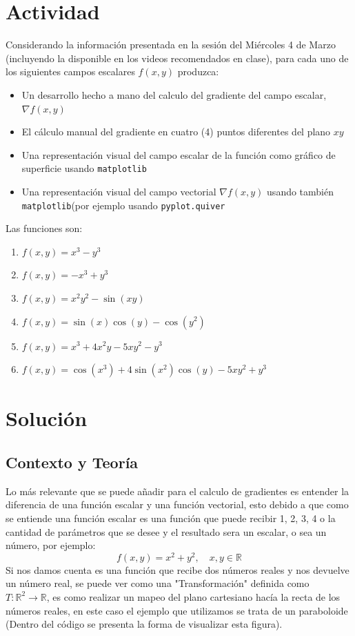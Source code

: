 \section*{Actividad}
Considerando la información presentada en la sesión del Miércoles 4 de Marzo (incluyendo la disponible en los videos recomendados en clase), para cada uno de los siguientes campos escalares $ f(x,y) $ produzca:
\begin{itemize}
    \item Un desarrollo hecho a mano del calculo del gradiente del campo escalar, $ \nabla  f(x,y) $ 
    \item El cálculo manual del gradiente en cuatro (4) puntos diferentes del plano $xy$
    \item Una representación visual del campo escalar de la función como gráfico de superficie usando \texttt{matplotlib}
    \item Una representación visual del campo vectorial $ \nabla  f(x,y) $ usando también \texttt{matplotlib}(por ejemplo usando \texttt{pyplot.quiver}
\end{itemize}
Las funciones son:
\begin{enumerate}
    \item $ f(x,y) = x^3-y^3 $
    \item $ f(x,y) = -x^3+y^3 $
    \item $ f(x,y) = x^2 y^2 -\sin{(xy)}$
    \item $ f(x,y) = \sin{(x)}\cos{(y)} -\cos{(y^2)}$
    \item $ f(x,y) = x^3+4x^2y - 5xy^2-y^3  $
    \item $ f(x,y) = \cos{(x^3)} + 4\sin{(x^2)}\cos{(y)}-5xy^2+y^3 $
\end{enumerate}
\section*{Solución}
\subsection*{Contexto y Teoría}
Lo más relevante que se puede añadir para el calculo de gradientes es entender la diferencia de una función escalar y una función vectorial, esto debido a que como se entiende una función escalar es una función que puede recibir 1, 2, 3, 4 o la cantidad de parámetros que se desee y el resultado sera un escalar, o sea un número, por ejemplo:
\[ f(x,y) = x^2 + y^2,\quad x,y \in \mathbb{R}\]
Si nos damos cuenta es una función que recibe dos números reales y nos devuelve un número real, se puede ver como una "Transformación"  definida como $T: \mathbb{R}^2 \rightarrow \mathbb{R}$, es como realizar un mapeo del plano  cartesiano hacía la recta de los números reales, en este caso el ejemplo que utilizamos se trata de un paraboloide (Dentro del código se presenta la forma de visualizar esta figura).
